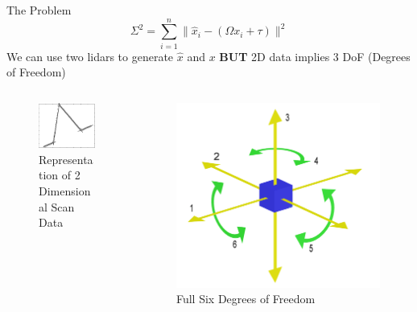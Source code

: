 \documentclass{beamer}
\begin{document}
\begin{frame}{The Problem}
    \[
        \Sigma^2 = \displaystyle\sum\limits_{i=1}^n {\parallel \hat{x}_i - ({\Omega}x_i + \tau) \parallel^2}
    \]
    We can use two lidars to generate $\hat{x}$ and $x$ \textbf{BUT} 2D data implies 3 DoF (Degrees of Freedom)
    \begin{columns}[T]
        \begin{column}{.5\textwidth}
            \begin{figure}
                \includegraphics[height=.45\textwidth]{Images/points.pdf}
                \caption{Representation of 2 Dimensional Scan Data}
            \end{figure}
        \end{column}
        \begin{column}{.5\textwidth}
                        \begin{figure}
                \includegraphics[height=.45\textwidth]{Images/dof.png}
                \caption{Full Six Degrees of Freedom}
            \end{figure}
        \end{column}
  \end{columns} 
\end{frame}
\end{document}
